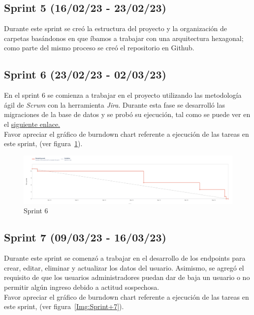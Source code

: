 \subsection{Sprint 5 (16/02/23 - 23/02/23)}\label{sprint-0-090223---230223}
Durante este sprint se creó la estructura del proyecto y la organización de carpetas basándonos en que íbamos a trabajar con una arquitectura hexagonal; como parte del mismo proceso se creó el repositorio en Github.

\subsection{Sprint 6 (23/02/23 - 02/03/23)}\label{sprint-0-090223---02032023}
En el sprint 6 se comienza a trabajar en el proyecto utilizando las metodología ágil de \emph{Scrum} con la herramienta \emph{Jira}.
Durante esta fase se desarrolló las migraciones de la base de datos y se probó su ejecución, tal como se puede ver en el \href{https://bullquine.atlassian.net/jira/software/projects/EMUR/boards/1/reports/burndown?source=overview}{siguiente enlace.}\\
Favor apreciar el gráfico de burndown chart referente a ejecución de las tareas en este sprint, (ver figura~\ref{Img:Sprint+6}).


\begin{figure}[h]
    \centering
    \includegraphics[width=1.0\textwidth]{img/sprint/sprint6.png}
    \caption{Sprint 6} \label{Img:Sprint+6}
\end{figure} 

\subsection{Sprint 7 (09/03/23 - 16/03/23)}\label{sprint-0-090223---160323}
Durante este sprint se comenzó a trabajar en el desarrollo de los endpoints para crear, editar, eliminar y actualizar los datos del usuario. Asimismo, se agregó el requisito de que los usuarios administradores puedan dar de baja un usuario o no permitir algún ingreso debido a actitud sospechosa.\\
Favor apreciar el gráfico de burndown chart referente a ejecución de las tareas en este sprint, (ver figura~\ref{Img:Sprint+7}).

